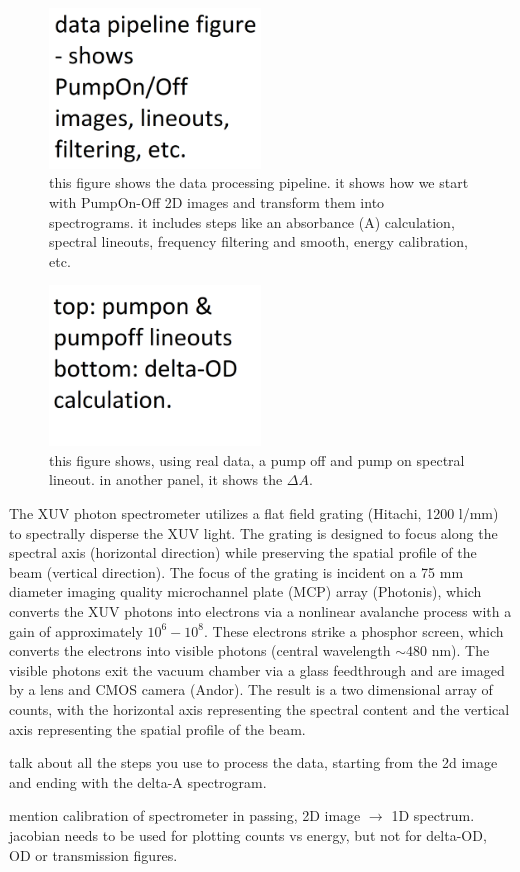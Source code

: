 \begin{figure}
	\centering
	\includegraphics[width=0.5\textwidth]{figures/chap3/Data_Pipeline.png}
	\caption{this figure shows the data processing pipeline. it shows how we start with PumpOn-Off 2D images and transform them into spectrograms. it includes steps like an absorbance (A) calculation, spectral lineouts, frequency filtering and smooth, energy calibration, etc.}
	\label{fig:Data_Pipeline}
\end{figure}

\begin{figure}
	\centering
	\includegraphics[width=0.5\textwidth]{figures/chap3/PumpOn_vs_PumpOff.png}
	\caption{this figure shows, using real data, a pump off and pump on spectral lineout. in another panel, it shows the $\Delta A$.}
	\label{fig:PumpOn_vs_PumpOff}
\end{figure}

The XUV photon spectrometer utilizes a flat field grating (Hitachi, 1200 l/mm) to spectrally disperse the XUV light. The grating is designed to focus along the spectral axis (horizontal direction) while preserving the spatial profile of the beam (vertical direction). The focus of the grating is incident on a 75 mm diameter imaging quality microchannel plate (MCP) array (Photonis), which converts the XUV photons into electrons via a nonlinear avalanche process with a gain of approximately $10^6 - 10^8$. These electrons strike a phosphor screen, which converts the electrons into visible photons (central wavelength $\sim480$ nm). The visible photons exit the vacuum chamber via a glass feedthrough and are imaged by a lens and CMOS camera (Andor). The result is a two dimensional array of counts, with the horizontal axis representing the spectral content and the vertical axis representing the spatial profile of the beam.

talk about all the steps you use to process the data, starting from the 2d image and ending with the delta-A spectrogram.

mention calibration of spectrometer in passing, 2D image $\rightarrow$ 1D spectrum. jacobian needs to be used for plotting counts vs energy, but not for delta-OD, OD or transmission figures.



